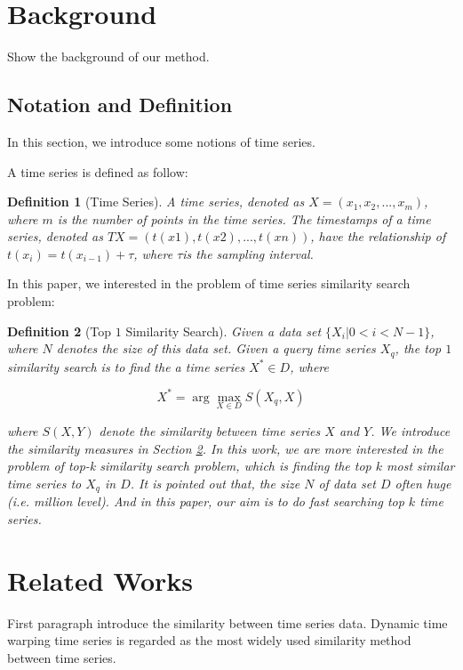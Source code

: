 \documentclass{article}
\newtheorem{definition}{Definition}
\begin{document}
\section{Background}
Show the background of our method.

\subsection{Notation and Definition}

In this section, we introduce some notions of time series. 

A time series is defined as follow:
\begin{definition}[Time Series]
A time series, denoted as $X = (x_1,x_2,...,x_m)$, where $m$ is the number of points in the time series. The timestamps of a time series, denoted as $TX = (t(x1), t(x2),..., t(xn))$, have the relationship of $t(x_i) = t(x_{i-1})+\tau$, where $\tau$is the sampling interval.
\end{definition}

In this paper, we interested in the problem of time series similarity search problem:
\begin{definition}[Top $1$ Similarity Search]
Given a data set $\{X_i|0<i<N-1\}$, where $N$ denotes the size of this data set. Given a query time series $X_q$, the top $1$ similarity search is to find the a time series $X^* \in D$, where

\begin{equation}
\label{knn}
X^* = \arg \max_{X \in D} S(X_q,X)
\end{equation}


where $S(X,Y)$ denote the similarity between time series $X$ and $Y$. We introduce the similarity measures in Section \ref{relatedwork}. In this work, we are more interested in the problem of top-k similarity search problem, which is finding the top $k$ most similar time series to $X_q$ in $D$. It is pointed out that, the size $N$ of data set $D$ often huge (i.e. million level). And in this paper, our aim is to do fast searching top $k$ time series.

\end{definition}

\section{Related Works}
\label{relatedwork}

First paragraph introduce the similarity between time series data.
Dynamic time warping \cite{rakthanmanon2012searching} time series is regarded as the most widely used similarity method between time series. 
\end{document}
